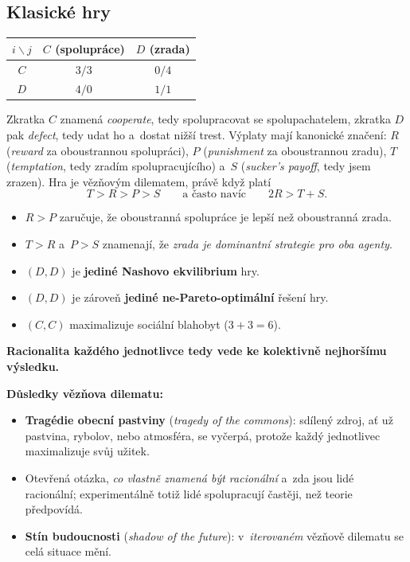 \documentclass[11pt,a4paper]{article}
\theoremstyle{definition}
\begin{document}
\subsection{Klasické hry}

\begin{defbox}
\begin{center}
\begin{tabular}{c|cc}
$i \backslash j$ & $C$ (spolupráce) & $D$ (zrada) \\
\hline
$C$ & $3/3$ & $0/4$ \\
$D$ & $4/0$ & $1/1$ \\
\end{tabular}
\end{center}
Zkratka $C$ znamená \emph{cooperate}, tedy spolupracovat se spolupachatelem, zkratka $D$ pak
\emph{defect}, tedy udat ho a~dostat nižší trest. Výplaty mají kanonické značení: $R$
(\emph{reward} za oboustrannou spolupráci), $P$ (\emph{punishment} za oboustrannou zradu), $T$
(\emph{temptation}, tedy zradím spolupracujícího) a~$S$ (\emph{sucker's payoff}, tedy jsem
zrazen). Hra je vězňovým dilematem, právě když platí
\[
T > R > P > S \qquad\text{a často navíc}\qquad 2R > T + S .
\]
\begin{itemize}
\item $R > P$ zaručuje, že oboustranná spolupráce je lepší než oboustranná zrada.
\item $T > R$ a~$P > S$ znamenají, že \emph{zrada je dominantní strategie pro oba agenty}.
\item $(D,D)$ je \textbf{jediné Nashovo ekvilibrium} hry.
\item $(D,D)$ je zároveň \textbf{jediné ne-Pareto-optimální} řešení hry.
\item $(C,C)$ maximalizuje sociální blahobyt ($3+3=6$).
\end{itemize}
\textbf{Racionalita každého jednotlivce tedy vede ke kolektivně nejhoršímu výsledku.}
\end{defbox}

\textbf{Důsledky vězňova dilematu:}
\begin{itemize}
\item \textbf{Tragédie obecní pastviny} (\emph{tragedy of the commons}): sdílený zdroj, ať už
  pastvina, rybolov, nebo atmosféra, se vyčerpá, protože každý jednotlivec maximalizuje svůj
  užitek.
\item Otevřená otázka, \emph{co vlastně znamená být racionální} a~zda jsou lidé racionální;
  experimentálně totiž lidé spolupracují častěji, než teorie předpovídá.
\item \textbf{Stín budoucnosti} (\emph{shadow of the future}): v~\emph{iterovaném} vězňově
  dilematu se celá situace mění.
\end{itemize}
\end{document}
